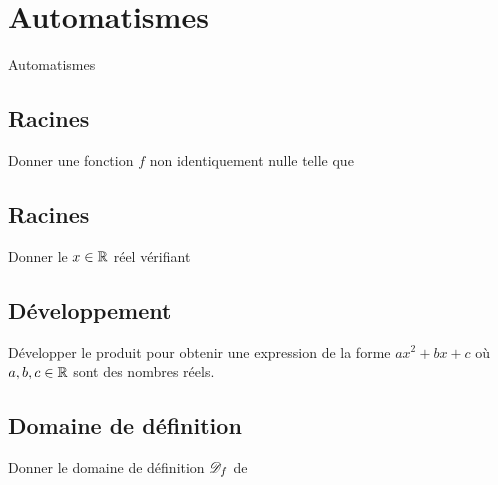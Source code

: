 
\AdvanceDate[3]



\section{Automatismes}

\begin{frame}

\centering \huge
Automatismes


\end{frame}

\subsection{Racines}

\begin{frame}{1}	
	Donner une fonction $f$ non identiquement nulle telle que

\end{frame}

\subsection{Racines}

\begin{frame}{2}	
	Donner le $x\in\mathbb{R}$ réel vérifiant
	\boxAB{
			\[ 5-3x = 0. \]
	}{
			\[ 11-8x = 0. \]
	}
\end{frame}


\subsection{Développement}

\begin{frame}{3}	
	Développer le produit pour obtenir une expression de la forme $ax^2 + bx + c$ où $a, b, c \in\mathbb{R}$ sont des nombres réels.
\end{frame}

\subsection{Domaine de définition}

\begin{frame}{4}	
	Donner le domaine de définition $\mathcal{D}_f$ de
	\boxAB{
			\[ f(x) = \sqrt{3+x}. \]
	}{
			\[ f(x) = \sqrt{-3+x}. \]
	}
\end{frame}



